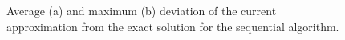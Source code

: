 \documentclass[smallcondensed]{svjour3}     %
\begin{document}
\begin{figure}
\begin{minipage}{0.5\linewidth}
\end{minipage}
\hfill
\begin{minipage}{0.5\linewidth}
\end{minipage}
\caption{Average (a) and maximum (b) deviation of the current approximation from the exact solution for the sequential algorithm.}
\label{fig_last1}
\end{figure}
\end{document}
